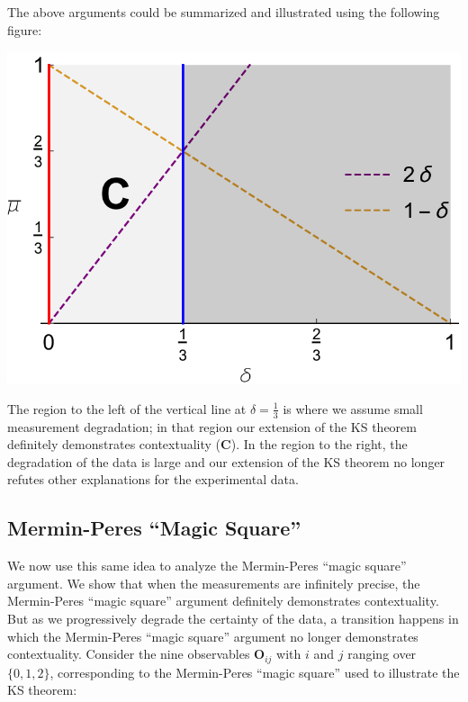 \documentclass[english,reprint, aps, prl,superscriptaddress, showpacs,
showkeys, longbibliography, amsmath, amssymb, floatfix]{revtex4-1}
\theoremstyle{plain}
\theoremstyle{definition}
\begin{document}
The above arguments could be summarized and illustrated using the
following figure: 
\begin{center}
\includegraphics[scale=0.5]{prop_letter_ajhs_referee_response_nb} 
\par\end{center}

\noindent The region to the left of the vertical line at
$\delta=\frac{1}{3}$ is where we assume small measurement degradation;
in that region our extension of the KS theorem definitely demonstrates
contextuality ({\bf{\sf C}}). In the region to the right, the degradation of the data
is large and our extension of the KS theorem no longer refutes other
explanations for the experimental data.

\subsection*{Mermin-Peres ``Magic Square''}

We now use this same idea to analyze the Mermin-Peres ``magic square''
argument. We show that when the measurements are infinitely precise,
the Mermin-Peres ``magic square'' argument definitely demonstrates
contextuality. But as we progressively degrade the certainty of the
data, a transition happens in which the Mermin-Peres ``magic square''
argument no longer demonstrates contextuality. Consider the nine observables
$\mathbf{O}_{ij}$ with $i$ and $j$ ranging over $\{0,1,2\}$, corresponding
to the Mermin-Peres ``magic square'' used to illustrate the KS theorem:
\end{document}
